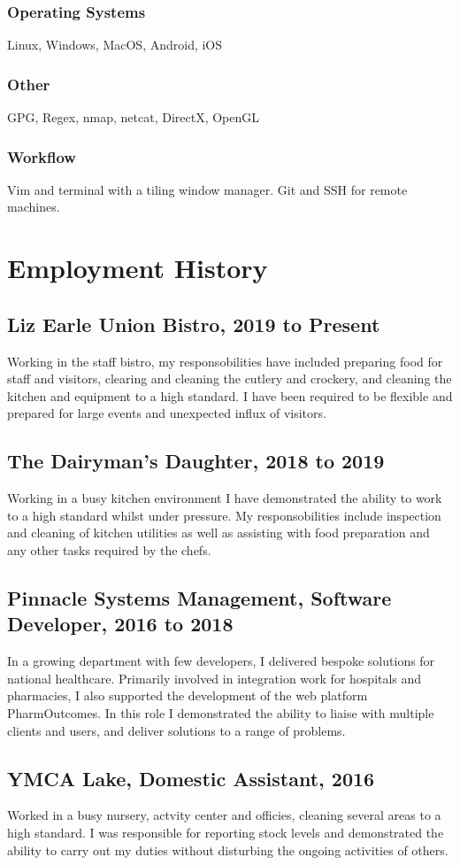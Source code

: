 \documentclass{article}
\begin{document}
\subsubsection{Operating Systems}
Linux, Windows, MacOS, Android, iOS
\subsubsection{Other}
GPG, Regex, nmap, netcat, DirectX, OpenGL
\subsubsection{Workflow}
Vim and terminal with a tiling window manager. Git and SSH for remote machines.

\section{Employment History}
\subsection{Liz Earle Union Bistro, 2019 to Present}
Working in the staff bistro, my responsobilities have included preparing food for staff and visitors, clearing and cleaning the cutlery and crockery, and cleaning the kitchen and equipment to a high standard.  I have been required to be flexible and prepared for large events and unexpected influx of visitors.
\subsection{The Dairyman's Daughter, 2018 to 2019}
Working in a busy kitchen environment I have demonstrated the ability to work to a high standard whilst under pressure.  My responsobilities include inspection and cleaning of kitchen utilities as well as assisting with food preparation and any other tasks required by the chefs.
\subsection{Pinnacle Systems Management, Software Developer, 2016 to 2018}
In a growing department with few developers, I delivered bespoke solutions for national healthcare.  Primarily involved in integration work for hospitals and pharmacies, I also supported the development of the web platform PharmOutcomes.  In this role I demonstrated the ability to liaise with multiple clients and users, and deliver solutions to a range of problems.
\subsection{YMCA Lake, Domestic Assistant, 2016}
Worked in a busy nursery, actvity center and officies, cleaning several areas to a high standard.  I was responsible for reporting stock levels and demonstrated the ability to carry out my duties without disturbing the ongoing activities of others.
\end{document}
